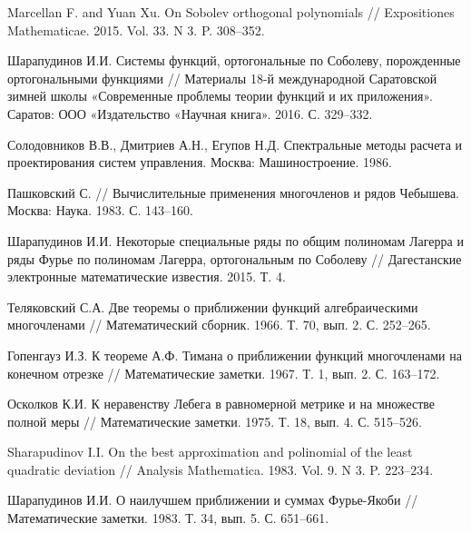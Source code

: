\begin{thebibliography}{999}
Marcellan F. and Yuan Xu. On Sobolev orthogonal polynomials // Expositiones Mathematicae. 2015. Vol. 33. N 3. P. 308--352.



 Шарапудинов И.И. Системы функций, ортогональные по Соболеву, порожденные ортогональными функциями // Материалы 18-й международной Саратовской зимней школы «Современные проблемы теории функций и их приложения». Саратов: ООО «Издательство «Научная книга». 2016. С. 329--332.



 Солодовников В.В., Дмитриев А.Н., Егупов Н.Д. Спектральные методы расчета и проектирования систем управления. Москва: Машиностроение. 1986.



Пашковский С. // Вычислительные применения многочленов и рядов Чебышева. Москва: Наука. 1983. С. 143--160.



 Шарапудинов И.И. Некоторые специальные ряды по общим полиномам Лагерра и ряды Фурье по полиномам Лагерра, ортогональным по Соболеву // Дагестанские электронные математические известия. 2015. Т. 4.



 Теляковский С.А. Две теоремы о приближении функций алгебраическими многочленами // Математический сборник. 1966. Т. 70, вып. 2. С. 252--265.



 Гопенгауз И.З. К теореме А.Ф. Тимана о приближении функций многочленами на конечном отрезке // Математические заметки. 1967. Т. 1, вып. 2. С. 163--172.



 Осколков К.И. К неравенству Лебега в равномерной метрике и на множестве полной меры // Математические  заметки. 1975. Т. 18, вып. 4. С. 515--526.



 Sharapudinov I.I. On the best approximation and polinomial of the least quadratic deviation // Analysis Mathematica. 1983. Vol. 9. N 3. P. 223--234.



 Шарапудинов И.И. О наилучшем приближении и суммах Фурье-Якоби // Математические заметки. 1983. Т. 34, вып. 5. С. 651--661.




\end{thebibliography}
